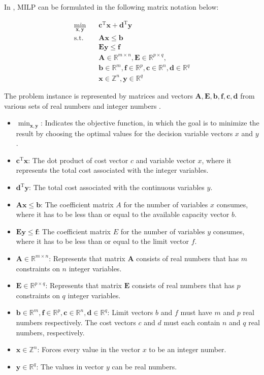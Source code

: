 \documentclass[journal]{IEEEtran}
\begin{document}
In \cite{milpdef}, MILP can be formulated in the following matrix notation below:

\begin{align*}
\min_{\bm{x},\bm{y}} \quad & \bm{c}^{\text{T}} \bm{x} + \bm{d}^{\text{T}} \bm{y} \\
\text{s.t.} \quad & \bm{Ax} \le \bm{b} \\
                  & \bm{Ey} \le \bm{f} \\
                  & \bm{A} \in \mathbb{R}^{m \times n}, \bm{E} \in \mathbb{R}^{p \times q}, \\
                  & \bm{b} \in \mathbb{R}^m, \bm{f} \in \mathbb{R}^p, \bm{c} \in \mathbb{R}^n, \bm{d} \in \mathbb{R}^q \\
                  & \bm{x} \in \mathbb{Z}^n, \bm{y} \in \mathbb{R}^q
\end{align*}

The problem instance is represented by matrices and vectors $\bm{A, E, b, f, c, d}$ from various sets of real numbers and integer numbers \cite{milpdef}.

\begin{itemize}
    \item $\min_{\bm{x},\bm{y}}$: Indicates the objective function, in which the goal is to minimize the result by choosing the optimal values for the decision variable vectors $x$ and $y$.
    \item $\bm{c}^{\text{T}} \bm{x}$: The dot product of cost vector $c$ and variable vector $x$, where it represents the total cost associated with the integer variables.
    \item $\bm{d}^{\text{T}} \bm{y}$: The total cost associated with the continuous variables $y$.
    \item $\bm{Ax} \le \bm{b}$: The coefficient matrix $A$ for the number of variables $x$ consumes, where it has to be less than or equal to the available capacity vector $b$.
    \item $\bm{Ey} \le \bm{f}$: The coefficient matrix $E$ for the number of variables $y$ consumes, where it has to be less than or equal to the limit vector $f$.
    \item $\bm{A} \in \mathbb{R}^{m \times n}$: Represents that matrix $\bm{A}$ consists of real numbers that has $m$ constraints on $n$ integer variables.
    \item $\bm{E} \in \mathbb{R}^{p \times q}$: Represents that matrix $\bm{E}$ consists of real numbers that has $p$ constraints on $q$ integer variables.
    \item $\bm{b} \in \mathbb{R}^m, \bm{f} \in \mathbb{R}^p, \bm{c} \in \mathbb{R}^n, \bm{d} \in \mathbb{R}^q$: Limit vectors $b$ and $f$ must have $m$ and $p$ real numbers respectively. The cost vectors $c$ and $d$ must each contain $n$ and $q$ real numbers, respectively.
    \item $\bm{x} \in \mathbb{Z}^n$: Forces every value in the vector $x$ to be an integer number.
    \item $\bm{y} \in \mathbb{R}^q$: The values in vector $y$ can be real numbers.
\end{itemize}
\end{document}
